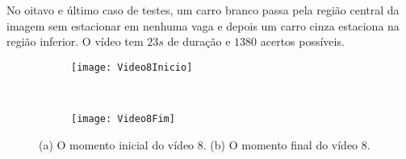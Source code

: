 No oitavo e último caso de testes, um carro branco passa pela região central da imagem sem estacionar em nenhuma vaga e depois um carro cinza estaciona na região inferior. O vídeo tem $23s$ de duração e $1380$ acertos possíveis.

\begin{figure}[!h]
\centering
\begin{subfigure}{.5\textwidth}
\centering
\texttt{[image: Video8Inicio]}
\caption{}
\end{subfigure}\
\begin{subfigure}{.5\textwidth}
\centering
\texttt{[image: Video8Fim]}
\caption{}
\end{subfigure}
\centering
\caption{(a) O momento inicial do vídeo 8. (b) O momento final do vídeo 8.}%
\label{}%
\end{figure}














